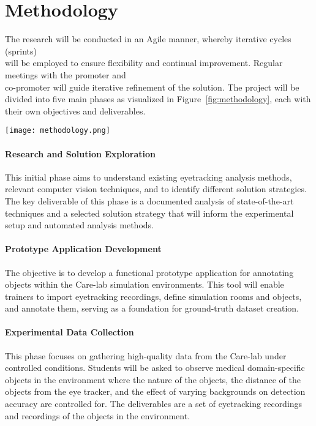 \documentclass[english]{hogent-article}
\begin{document}
\section{Methodology}
\label{sec:methodology}

The research will be conducted in an Agile manner, whereby iterative cycles (sprints)\\ will be employed 
to ensure flexibility and continual improvement.
Regular meetings with the promoter and\\ co-promoter will guide iterative refinement of the solution.
The project will be divided into five main phases as visualized in Figure~\ref{fig:methodology}, each with their own objectives and deliverables.

\begin{figure*}
  \centering
  \texttt{[image: methodology.png]}
  \caption{Overview of the project phases, their deliverables, and the relationships between them.}
  \label{fig:methodology}
\end{figure*}

\paragraph{Research and Solution Exploration\\}
This initial phase aims to understand existing eyetracking analysis methods, 
relevant computer vision techniques, and to identify different solution strategies. 
The key deliverable of this phase is a documented analysis of state-of-the-art techniques and a selected solution strategy 
that will inform the experimental setup and automated analysis methods.

\paragraph{Prototype Application Development\\}
The objective is to develop a functional prototype application for annotating objects within the Care-lab simulation environments.
This tool will enable trainers to import eyetracking recordings, define simulation rooms and objects, and annotate them, 
serving as a foundation for ground-truth dataset creation.

\paragraph{Experimental Data Collection\\}
This phase focuses on gathering high-quality data from the Care-lab under controlled conditions. 
Students will be asked to observe medical domain-specific objects in the environment where the nature of the objects, 
the distance of the objects from the eye tracker, and the effect of varying backgrounds on detection accuracy are controlled for.
The deliverables are a set of eyetracking recordings and recordings of the objects in the environment.
\end{document}
